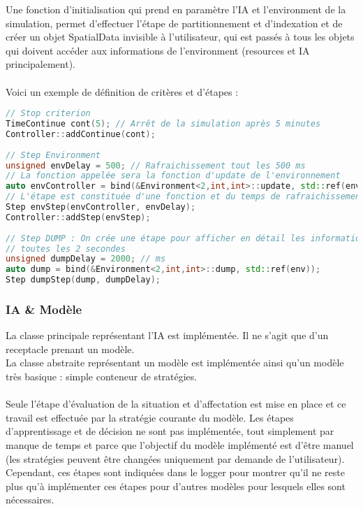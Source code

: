 Une fonction d'initialisation qui prend en paramètre l'IA et l'environment de la simulation, permet d'effectuer l'étape de partitionnement et d'indexation et de créer un objet SpatialData invisible à l'utilisateur, qui est passés à tous les objets qui doivent accéder aux informations de l'environment (resources et IA principalement).\\\\
Voici un exemple de définition de critères et d'étapes :

\begin{lstlisting}[label=nvi_code,caption=Paramètres du contrôleur,language=C++]
// Stop criterion
TimeContinue cont(5); // Arrêt de la simulation après 5 minutes
Controller::addContinue(cont);
        
// Step Environment
unsigned envDelay = 500; // Rafraichissement tout les 500 ms
// La fonction appelée sera la fonction d'update de l'environnement
auto envController = bind(&Environment<2,int,int>::update, std::ref(env), placeholders::_1);
// L'étape est constituée d'une fonction et du temps de rafraichissement
Step envStep(envController, envDelay);
Controller::addStep(envStep);
        
// Step DUMP : On crée une étape pour afficher en détail les informations de l'environnement
// toutes les 2 secondes
unsigned dumpDelay = 2000; // ms
auto dump = bind(&Environment<2,int,int>::dump, std::ref(env));
Step dumpStep(dump, dumpDelay);
\end{lstlisting}

\subsubsection{IA \& Modèle}

La classe principale représentant l'IA est implémentée. Il ne s'agit que d'un receptacle prenant un modèle.\\
La classe abstraite représentant un modèle est implémentée ainsi qu'un modèle très basique : simple conteneur de stratégies.\\\\

Seule l'étape d'évaluation de la situation et d'affectation est mise en place et ce travail est effectuée par la stratégie courante du modèle. Les étapes d'apprentissage et de décision ne sont pas implémentée, tout simplement par manque de temps et parce que l'objectif du modèle implémenté est d'être manuel (les stratégies peuvent être changées uniquement par demande de l'utilisateur).\\
Cependant, ces étapes sont indiquées dans le logger pour montrer qu'il ne reste plus qu'à implémenter ces étapes pour d'autres modèles pour lesquels elles sont nécessaires.

